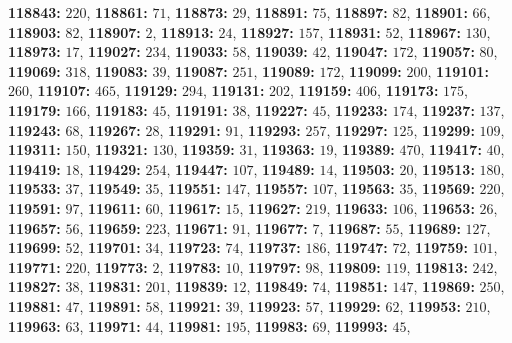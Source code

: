 \textsf{\bfseries 118843:} $220$, \textsf{\bfseries 118861:} $71$, \textsf{\bfseries 118873:} $29$, \textsf{\bfseries 118891:} $75$, \textsf{\bfseries 118897:} $82$, \textsf{\bfseries 118901:} $66$, \textsf{\bfseries 118903:} $82$, \textsf{\bfseries 118907:} $2$, \textsf{\bfseries 118913:} $24$, \textsf{\bfseries 118927:} $157$, \textsf{\bfseries 118931:} $52$, \textsf{\bfseries 118967:} $130$, \textsf{\bfseries 118973:} $17$, \textsf{\bfseries 119027:} $234$, \textsf{\bfseries 119033:} $58$, \textsf{\bfseries 119039:} $42$, \textsf{\bfseries 119047:} $172$, \textsf{\bfseries 119057:} $80$, \textsf{\bfseries 119069:} $318$, \textsf{\bfseries 119083:} $39$, \textsf{\bfseries 119087:} $251$, \textsf{\bfseries 119089:} $172$, \textsf{\bfseries 119099:} $200$, \textsf{\bfseries 119101:} $260$, \textsf{\bfseries 119107:} $465$, \textsf{\bfseries 119129:} $294$, \textsf{\bfseries 119131:} $202$, \textsf{\bfseries 119159:} $406$, \textsf{\bfseries 119173:} $175$, \textsf{\bfseries 119179:} $166$, \textsf{\bfseries 119183:} $45$, \textsf{\bfseries 119191:} $38$, \textsf{\bfseries 119227:} $45$, \textsf{\bfseries 119233:} $174$, \textsf{\bfseries 119237:} $137$, \textsf{\bfseries 119243:} $68$, \textsf{\bfseries 119267:} $28$, \textsf{\bfseries 119291:} $91$, \textsf{\bfseries 119293:} $257$, \textsf{\bfseries 119297:} $125$, \textsf{\bfseries 119299:} $109$, \textsf{\bfseries 119311:} $150$, \textsf{\bfseries 119321:} $130$, \textsf{\bfseries 119359:} $31$, \textsf{\bfseries 119363:} $19$, \textsf{\bfseries 119389:} $470$, \textsf{\bfseries 119417:} $40$, \textsf{\bfseries 119419:} $18$, \textsf{\bfseries 119429:} $254$, \textsf{\bfseries 119447:} $107$, \textsf{\bfseries 119489:} $14$, \textsf{\bfseries 119503:} $20$, \textsf{\bfseries 119513:} $180$, \textsf{\bfseries 119533:} $37$, \textsf{\bfseries 119549:} $35$, \textsf{\bfseries 119551:} $147$, \textsf{\bfseries 119557:} $107$, \textsf{\bfseries 119563:} $35$, \textsf{\bfseries 119569:} $220$, \textsf{\bfseries 119591:} $97$, \textsf{\bfseries 119611:} $60$, \textsf{\bfseries 119617:} $15$, \textsf{\bfseries 119627:} $219$, \textsf{\bfseries 119633:} $106$, \textsf{\bfseries 119653:} $26$, \textsf{\bfseries 119657:} $56$, \textsf{\bfseries 119659:} $223$, \textsf{\bfseries 119671:} $91$, \textsf{\bfseries 119677:} $7$, \textsf{\bfseries 119687:} $55$, \textsf{\bfseries 119689:} $127$, \textsf{\bfseries 119699:} $52$, \textsf{\bfseries 119701:} $34$, \textsf{\bfseries 119723:} $74$, \textsf{\bfseries 119737:} $186$, \textsf{\bfseries 119747:} $72$, \textsf{\bfseries 119759:} $101$, \textsf{\bfseries 119771:} $220$, \textsf{\bfseries 119773:} $2$, \textsf{\bfseries 119783:} $10$, \textsf{\bfseries 119797:} $98$, \textsf{\bfseries 119809:} $119$, \textsf{\bfseries 119813:} $242$, \textsf{\bfseries 119827:} $38$, \textsf{\bfseries 119831:} $201$, \textsf{\bfseries 119839:} $12$, \textsf{\bfseries 119849:} $74$, \textsf{\bfseries 119851:} $147$, \textsf{\bfseries 119869:} $250$, \textsf{\bfseries 119881:} $47$, \textsf{\bfseries 119891:} $58$, \textsf{\bfseries 119921:} $39$, \textsf{\bfseries 119923:} $57$, \textsf{\bfseries 119929:} $62$, \textsf{\bfseries 119953:} $210$, \textsf{\bfseries 119963:} $63$, \textsf{\bfseries 119971:} $44$, \textsf{\bfseries 119981:} $195$, \textsf{\bfseries 119983:} $69$, \textsf{\bfseries 119993:} $45$, 
